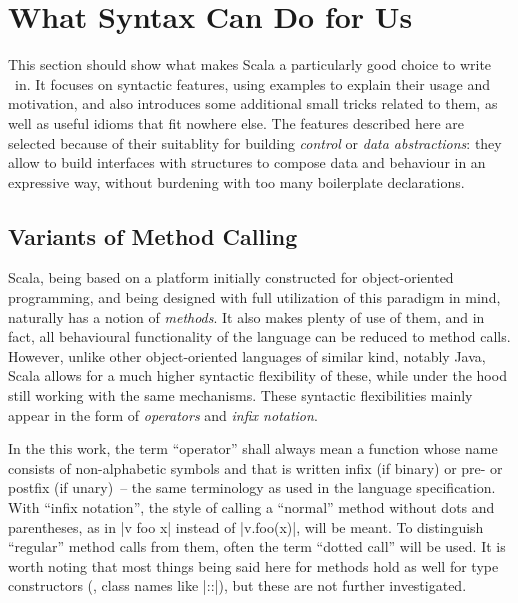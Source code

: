 \chapter{What Syntax Can Do for Us}
\label{sec:syntax}

This section should show what makes Scala a particularly good choice to write \dsls\ in. It focuses
on syntactic features, using examples to explain their usage and motivation, and also introduces
some additional small tricks related to them, as well as useful idioms that fit nowhere else. The
features described here are selected because of their suitablity for building \emph{control} or
\emph{data abstractions}: they allow to build interfaces with structures to compose data and
behaviour in an expressive way, without burdening with too many boilerplate declarations.

\section{Variants of Method Calling}
\label{sec:method_calling}

Scala, being based on a platform initially constructed for object-oriented programming, and being
designed with full utilization of this paradigm in mind, naturally has a notion of
\emph{methods}. It also makes plenty of use of them, and in fact, all behavioural functionality of
the language can be reduced to method calls. However, unlike other object-oriented languages of
similar kind, notably Java, Scala allows for a much higher syntactic flexibility of these, while
under the hood still working with the same mechanisms. These syntactic flexibilities mainly appear
in the form of \emph{operators} and \emph{infix notation}.

In the this work, the term \enquote{operator} shall always mean a function whose name consists of
non-alphabetic symbols and that is written infix (if binary) or pre- or postfix (if unary)~-- the
same terminology as used in the language specification. With \enquote{infix notation}, the style of
calling a \enquote{normal} method without dots and parentheses, as in |v foo x| instead of
|v.foo(x)|, will be meant. To distinguish \enquote{regular} method calls from them, often the term
\enquote{dotted call} will be used.  It is worth noting that most things being said here for methods
hold as well for type constructors (\ie, class names like |::|), but these are not further
investigated.

